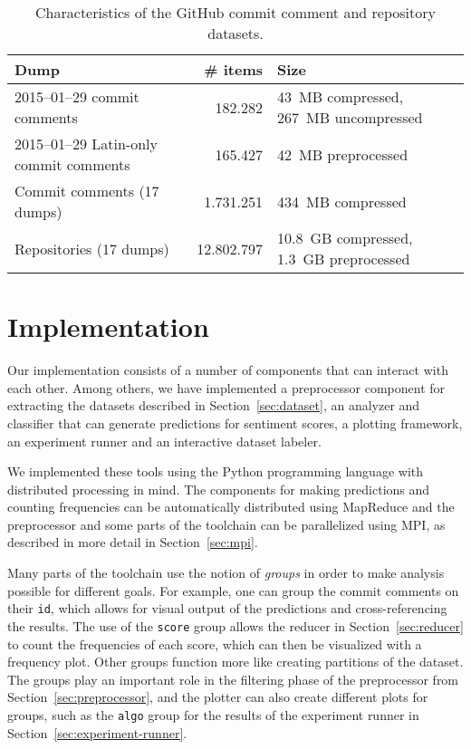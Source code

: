 \documentclass{article}
\begin{document}
\begin{table}[h]
  \centering
  \begin{tabular}{l r l}
    \toprule
    \textbf{Dump}                           & \textbf{\# items} & \textbf{Size}                           \\
    \midrule
    2015--01--29 commit comments            & 182.282           & 43~MB compressed, 267~MB uncompressed   \\
    2015--01--29 Latin-only commit comments & 165.427           & 42~MB preprocessed                      \\
    Commit comments (17 dumps)              & 1.731.251         & 434~MB compressed                       \\
    Repositories (17 dumps)                 & 12.802.797        & 10.8~GB compressed, 1.3~GB preprocessed \\
    \bottomrule
  \end{tabular}
  \caption{Characteristics of the GitHub commit comment and repository datasets.}\label{tab:dataset}
\end{table}

\section{Implementation}\label{sec:implementation}
Our implementation consists of a number of components that can interact with 
each other. Among others, we have implemented a preprocessor component for 
extracting the datasets described in Section~\ref{sec:dataset}, an analyzer and 
classifier that can generate predictions for sentiment scores, a plotting 
framework, an experiment runner and an interactive dataset labeler.

We implemented these tools using the Python programming language with 
distributed processing in mind. The components for making predictions and 
counting frequencies can be automatically distributed using MapReduce and the 
preprocessor and some parts of the toolchain can be parallelized using MPI, as 
described in more detail in Section~\ref{sec:mpi}.

Many parts of the toolchain use the notion of \emph{groups} in order to make 
analysis possible for different goals. For example, one can group the commit 
comments on their {\tt id}, which allows for visual output of the predictions 
and cross-referencing the results. The use of the {\tt score} group allows the 
reducer in Section~\ref{sec:reducer} to count the frequencies of each score, 
which can then be visualized with a frequency plot. Other groups function more 
like creating partitions of the dataset. The groups play an important role in
the filtering phase of the preprocessor from Section~\ref{sec:preprocessor},
and the plotter can also create different plots for groups, such as the
{\tt algo} group for the results of the experiment runner in
Section~\ref{sec:experiment-runner}.
\end{document}
